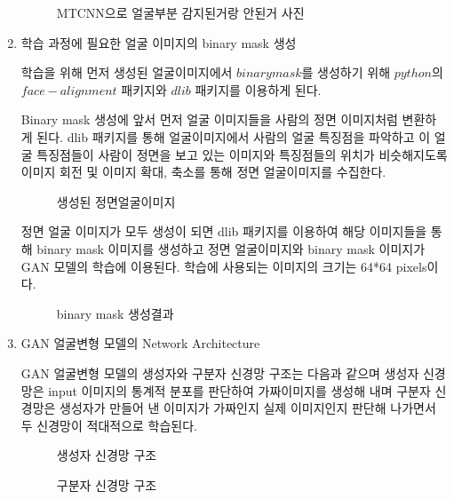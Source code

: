 \documentclass{oblivoir}
\begin{document}
\begin{enumerate}
    \begin{figure}[h!]%
    \centering
    \caption{MTCNN으로 얼굴부분 감지된거랑 안된거 사진}
    \end{figure}


    \item 학습 과정에 필요한 얼굴 이미지의 binary mask 생성

    학습을 위해 먼저 생성된 얼굴이미지에서 $binary mask$를 생성하기 위해 $python$의 $face-alignment$ 패키지와 $dlib$ 패키지를 이용하게 된다.

    Binary mask 생성에 앞서 먼저 얼굴 이미지들을 사람의 정면 이미지처럼 변환하게 된다. dlib 패키지를 통해 얼굴이미지에서 사람의 얼굴 특징점을 파악하고 이 얼굴 특징점들이 사람이 정면을 보고 있는 이미지와 특징점들의 위치가 비슷해지도록 이미지 회전 및 이미지 확대, 축소를 통해 정면 얼굴이미지를 수집한다.
    \begin{figure}[h!] %
    \centering
    \caption{생성된 정면얼굴이미지}
    \end{figure}



    정면 얼굴 이미지가 모두 생성이 되면 dlib 패키지를 이용하여 해당 이미지들을 통해 binary mask 이미지를 생성하고 정면 얼굴이미지와 binary mask 이미지가 GAN 모델의 학습에 이용된다. 학습에 사용되는 이미지의 크기는 64*64 pixels이다. 
    \begin{figure}[h!]%
    \centering
    \caption{binary mask 생성결과}
    \end{figure}


    \item GAN 얼굴변형 모델의 Network Architecture

    GAN 얼굴변형 모델의 생성자와 구분자 신경망 구조는 다음과 같으며 생성자 신경망은 input 이미지의 통계적 분포를 판단하여 가짜이미지를 생성해 내며 구분자 신경망은 생성자가 만들어 낸 이미지가 가짜인지 실제 이미지인지 판단해 나가면서 두 신경망이 적대적으로 학습된다.

    \begin{figure}[h!]
    \centering
    \caption{생성자 신경망 구조 \cite{reference11}}
    \end{figure}


    \begin{figure}[h!]
    \centering
    \caption{구분자 신경망 구조\cite{reference11}}
    \end{figure}


\end{enumerate}
\end{document}
